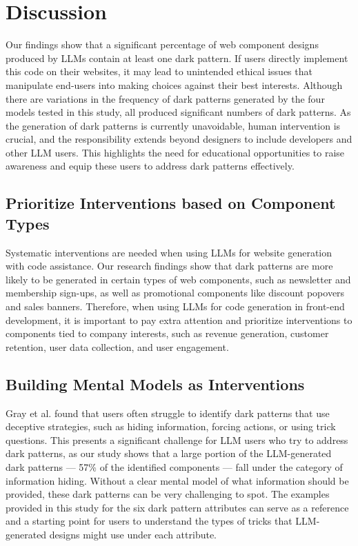 \section{Discussion}
Our findings show that a significant percentage of web component designs produced by LLMs contain at least one dark pattern. If users directly implement this code on their websites, it may lead to unintended ethical issues that manipulate end-users into making choices against their best interests. Although there are variations in the frequency of dark patterns generated by the four models tested in this study, all produced significant numbers of dark patterns. As the generation of dark patterns is currently unavoidable, human intervention is crucial, and the responsibility extends beyond designers to include developers and other LLM users. This highlights the need for educational opportunities to raise awareness and equip these users to address dark patterns effectively.

\subsection{Prioritize Interventions based on Component Types}
Systematic interventions are needed when using LLMs for website generation with code assistance. Our research findings show that dark patterns are more likely to be generated in certain types of web components, such as newsletter and membership sign-ups, as well as promotional components like discount popovers and sales banners. Therefore, when using LLMs for code generation in front-end development, it is important to pay extra attention and prioritize interventions to components tied to company interests, such as revenue generation, customer retention, user data collection, and user engagement. 


\subsection{Building Mental Models as Interventions}
Gray et al. \cite{a:42} found that users often struggle to identify dark patterns that use deceptive strategies, such as hiding information, forcing actions, or using trick questions. This presents a significant challenge for LLM users who try to address dark patterns, as our study shows that a large portion of the LLM-generated dark patterns --- 57\% of the identified components --- fall under the category of information hiding. Without a clear mental model of what information should be provided, these dark patterns can be very challenging to spot. The examples provided in this study for the six dark pattern attributes can serve as a reference and a starting point for users to understand the types of tricks that LLM-generated designs might use under each attribute.

